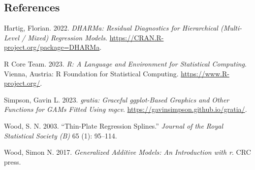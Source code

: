 \documentclass[
  letterpaper,
  DIV=11,
  numbers=noendperiod]{scrartcl}
\newlength{\cslhangindent}
\newlength{\cslentryspacingunit} %
\newenvironment{CSLReferences}[2] %
 {%
  \setlength{\parindent}{0pt}
  \ifodd #1
  \let\oldpar\par
  \def\par{\hangindent=\cslhangindent\oldpar}
  \fi
  \setlength{\parskip}{#2\cslentryspacingunit}
 }%
 {}
\begin{document}
\hypertarget{references}{%
\subsection{References}\label{references}}

\hypertarget{refs}{}
\begin{CSLReferences}{1}{0}
\leavevmode{}%
Hartig, Florian. 2022. \emph{DHARMa: Residual Diagnostics for
Hierarchical (Multi-Level / Mixed) Regression Models}.
\url{https://CRAN.R-project.org/package=DHARMa}.

\leavevmode{}%
R Core Team. 2023. \emph{R: A Language and Environment for Statistical
Computing}. Vienna, Austria: R Foundation for Statistical Computing.
\url{https://www.R-project.org/}.

\leavevmode{}%
Simpson, Gavin L. 2023. \emph{{gratia}: Graceful {ggplot}-Based Graphics
and Other Functions for {GAM}s Fitted Using {mgcv}}.
\url{https://gavinsimpson.github.io/gratia/}.

\leavevmode{}%
Wood, S. N. 2003. {``Thin-Plate Regression Splines.''} \emph{Journal of
the Royal Statistical Society (B)} 65 (1): 95--114.

\leavevmode{}%
Wood, Simon N. 2017. \emph{Generalized Additive Models: An Introduction
with r}. CRC press.

\end{CSLReferences}
\end{document}
